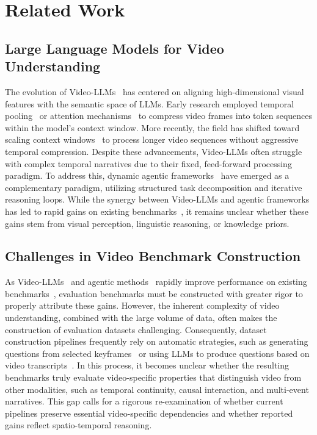 \documentclass[runningheads]{llncs}
\begin{document}
\section{Related Work}
\label{sec:related}
{
    \subsection{Large Language Models for Video Understanding}
        The evolution of Video-LLMs~\cite{videollava, qwem3_vl, longvu, eagle25, internvideo2} has centered on aligning high-dimensional visual features with the semantic space of LLMs. 
        Early research employed temporal pooling~\cite{videollava} or attention mechanisms~\cite{internvideo2} to compress video frames into token sequences within the model's context window.
        More recently, the field has shifted toward scaling context windows~\cite{longvu,eagle25, videoxl} to process longer video sequences without aggressive temporal compression.
        Despite these advancements, Video-LLMs often struggle with complex temporal narratives due to their fixed, feed-forward processing paradigm.
        To address this, dynamic agentic frameworks~\cite{videotree, worldmm, lvagent, dvd, adavideorag, vgent, HAVEN, VideoChatM1} have emerged as a complementary paradigm, utilizing structured task decomposition and iterative reasoning loops. 
        While the synergy between Video-LLMs and agentic frameworks has led to rapid gains on existing benchmarks~\cite{egoschema,longvideobench,videomme,mlvu}, it remains unclear whether these gains stem from visual perception, linguistic reasoning, or knowledge priors.
    
    \subsection{Challenges in Video Benchmark Construction}
        As Video-LLMs~\cite{eagle25,videoautor1} and agentic methods~\cite{VideoChatM1,HAVEN,videotool} rapidly improve performance on existing benchmarks~\cite{egoschema,videomme,longvideobench,mlvu}, evaluation benchmarks must be constructed with greater rigor to properly attribute these gains.
        However, the inherent complexity of video understanding, combined with the large volume of data, often makes the construction of evaluation datasets challenging.
        Consequently, dataset construction pipelines frequently rely on automatic strategies, such as generating questions from selected keyframes~\cite{Videoespresso, videochat} or using LLMs to produce questions based on video transcripts~\cite{vsibench, longvideobench, mvbench}.
        In this process, it becomes unclear whether the resulting benchmarks truly evaluate video-specific properties that distinguish video from other modalities, such as temporal continuity, causal interaction, and multi-event narratives.
        This gap calls for a rigorous re-examination of whether current pipelines preserve essential video-specific dependencies and whether reported gains reflect spatio-temporal reasoning.
            
}
\end{document}
